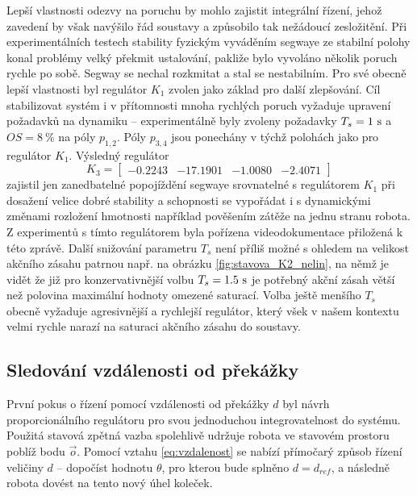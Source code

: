 \documentclass[conference]{IEEEtran}
\begin{document}
Lepší vlastnosti odezvy na poruchu by mohlo zajistit integrální řízení, jehož zavedení by však navýšilo řád soustavy a způsobilo tak nežádoucí zesložitění.
Při experimentálních testech stability fyzickým vyváděním segwaye ze stabilní polohy konal problémy velký překmit ustalování, pakliže bylo vyvoláno
několik poruch rychle po sobě. Segway se nechal rozkmitat a stal se nestabilním. Pro své obecně lepší vlastnosti byl regulátor $K_1$ zvolen jako základ
pro další zlepšování. Cíl stabilizovat systém i v přítomnosti mnoha rychlých poruch vyžaduje upravení požadavků na dynamiku -- experimentálně byly zvoleny
požadavky $T_s = 1~\text{\si{\second}}$ a $OS = 8~\%$ na póly $p_{1,2}$. Póly $p_{3,4}$ jsou ponechány v týchž polohách jako pro regulátor $K_1$.
Výsledný regulátor
\begin{equation*}
    K_3 = \begin{bmatrix}
        -0.2243 & -17.1901 &  -1.0080 &  -2.4071
    \end{bmatrix}
\end{equation*}
zajistil jen zanedbatelné popojíždění segwaye srovnatelné s regulátorem $K_1$ při dosažení velice dobré stability a schopnosti se vypořádat i s dynamickými změnami rozložení
hmotnosti například pověšením zátěže na jednu stranu robota. Z experimentů s tímto regulátorem byla pořízena videodokumentace přiložená k této zprávě.
Další snižování parametru $T_s$ není příliš možné s ohledem na velikost akčního zásahu patrnou např. na obrázku \ref{fig:stavova_K2_nelin}, na němž je vidět že již pro
konzervativnější volbu $T_s = 1.5~\text{\si{\second}}$ je potřebný akční zásah větší než polovina maximální hodnoty omezené saturací.   
Volba ještě menšího $T_s$ obecně vyžaduje agresivnější a rychlejší regulátor, který všek v našem kontextu velmi rychle narazí na saturaci akčního zásahu do soustavy.


\subsection{Sledování vzdálenosti od překážky}

První pokus o řízení pomocí vzdálenosti od překážky $d$ byl návrh proporcionálního regulátoru pro svou jednoduchou integrovatelnost do systému.
Použitá stavová zpětná vazba spolehlivě udržuje robota ve stavovém prostoru poblíž bodu $\vec{o}$. Pomocí vztahu \eqref{eq:vzdalenost} se nabízí přímočarý
způsob řízení veličiny $d$ -- dopočíst hodnotu $\theta$, pro kterou bude splněno $d = d_{ref}$, a následně robota dovést na tento nový úhel koleček. 
\end{document}
